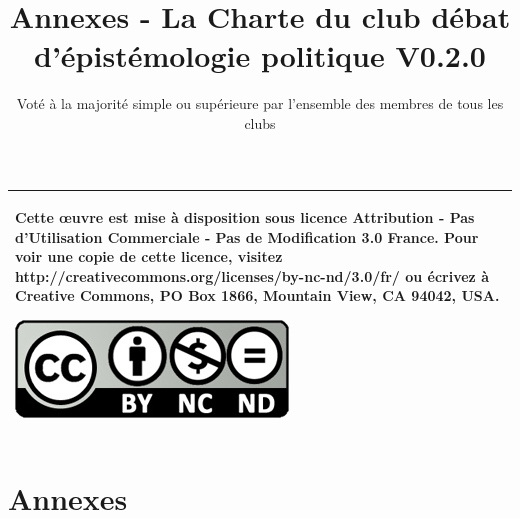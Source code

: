 \documentclass[a4paper,12pt]{article}
\title{\Huge{Annexes - La Charte du club débat d'épistémologie politique} \LARGE{V0.2.0}}
\author{Voté à la majorité simple ou supérieure par l'ensemble des membres de tous les clubs}
\begin{document}
\maketitle

\begin{tabular}{|p{}|}
 \hline
 Cette œuvre est mise à disposition sous licence Attribution - Pas d’Utilisation Commerciale - Pas de Modification 3.0 France. Pour voir une copie de cette licence, visitez http://creativecommons.org/licenses/by-nc-nd/3.0/fr/ ou écrivez à Creative Commons, PO Box 1866, Mountain View, CA 94042, USA.
 \begin{center}
 \includegraphics[scale=1]{cc.jpg}
 \end{center}\\
 \hline
\end{tabular}
\newpage
\tableofcontents
\newpage

\part{Annexes}
\end{document}

